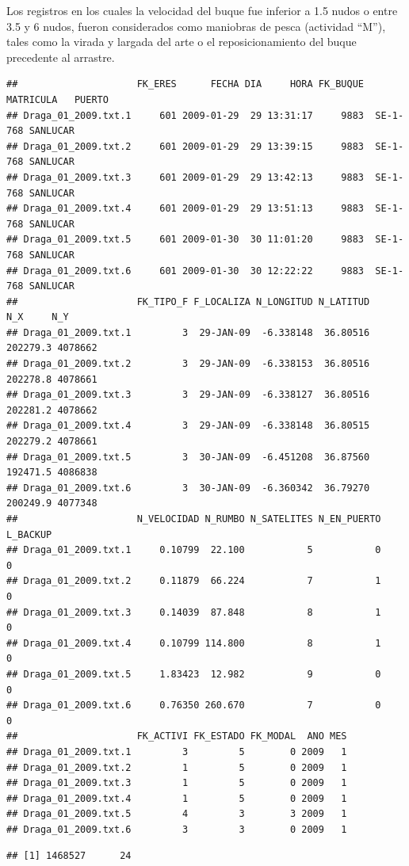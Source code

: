 \documentclass[
]{article}
\begin{document}
Los registros en los cuales la velocidad del buque fue inferior a 1.5 nudos o entre 3.5 y 6 nudos, fueron considerados como maniobras de pesca (actividad ``M''), tales como la virada y largada del arte o el reposicionamiento del buque precedente al arrastre.

\begin{verbatim}
##                     FK_ERES      FECHA DIA     HORA FK_BUQUE MATRICULA   PUERTO
## Draga_01_2009.txt.1     601 2009-01-29  29 13:31:17     9883  SE-1-768 SANLUCAR
## Draga_01_2009.txt.2     601 2009-01-29  29 13:39:15     9883  SE-1-768 SANLUCAR
## Draga_01_2009.txt.3     601 2009-01-29  29 13:42:13     9883  SE-1-768 SANLUCAR
## Draga_01_2009.txt.4     601 2009-01-29  29 13:51:13     9883  SE-1-768 SANLUCAR
## Draga_01_2009.txt.5     601 2009-01-30  30 11:01:20     9883  SE-1-768 SANLUCAR
## Draga_01_2009.txt.6     601 2009-01-30  30 12:22:22     9883  SE-1-768 SANLUCAR
##                     FK_TIPO_F F_LOCALIZA N_LONGITUD N_LATITUD      N_X     N_Y
## Draga_01_2009.txt.1         3  29-JAN-09  -6.338148  36.80516 202279.3 4078662
## Draga_01_2009.txt.2         3  29-JAN-09  -6.338153  36.80516 202278.8 4078661
## Draga_01_2009.txt.3         3  29-JAN-09  -6.338127  36.80516 202281.2 4078662
## Draga_01_2009.txt.4         3  29-JAN-09  -6.338148  36.80515 202279.2 4078661
## Draga_01_2009.txt.5         3  30-JAN-09  -6.451208  36.87560 192471.5 4086838
## Draga_01_2009.txt.6         3  30-JAN-09  -6.360342  36.79270 200249.9 4077348
##                     N_VELOCIDAD N_RUMBO N_SATELITES N_EN_PUERTO L_BACKUP
## Draga_01_2009.txt.1     0.10799  22.100           5           0        0
## Draga_01_2009.txt.2     0.11879  66.224           7           1        0
## Draga_01_2009.txt.3     0.14039  87.848           8           1        0
## Draga_01_2009.txt.4     0.10799 114.800           8           1        0
## Draga_01_2009.txt.5     1.83423  12.982           9           0        0
## Draga_01_2009.txt.6     0.76350 260.670           7           0        0
##                     FK_ACTIVI FK_ESTADO FK_MODAL  ANO MES
## Draga_01_2009.txt.1         3         5        0 2009   1
## Draga_01_2009.txt.2         1         5        0 2009   1
## Draga_01_2009.txt.3         1         5        0 2009   1
## Draga_01_2009.txt.4         1         5        0 2009   1
## Draga_01_2009.txt.5         4         3        3 2009   1
## Draga_01_2009.txt.6         3         3        0 2009   1
\end{verbatim}

\begin{verbatim}
## [1] 1468527      24
\end{verbatim}
\end{document}
